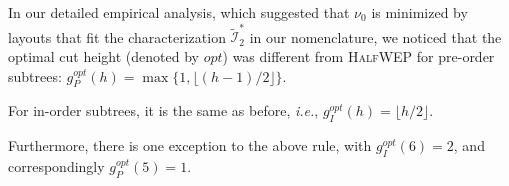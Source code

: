 \documentclass[10pt,conference,letterpaper]{IEEEtran}
\newcommand{\todo}[1]{}
\newcommand{\comment}[1]{}
\newcommand{\HLs}{Hierarchical Layouts\xspace}
\newcommand{\IN}{\ensuremath{\mathcal{I}}\xspace}
\newcommand{\alt}[1]{\widetilde{#1}}
\newcommand{\opt}{\ensuremath{\mathit{opt}}\xspace}
\newcommand{\FLOOR}[1]{\ensuremath{\lfloor #1 \rfloor}\xspace}
\newcommand{\ie}{{\it i.e.}\xspace}
\newcommand{\pwmean}[1][p]{\ensuremath{\nu_{#1}}\xspace}
\newcommand{\minwep}{\textsc{MinWEP}\xspace}
\newcommand{\halfwep}{\textsc{HalfWEP}\xspace}
\begin{document}
\todo{
What about cut heights? Emperical graph comparing with optimal.

ApproxWEP: in/pre have different cut heights. Why do we use these? Motivation - symmetric, and empirical.
Other Observations: For MINWEP, special cases cut heights.

}

\comment{
To find the best cut height, we undertook a detailed empirical study that computed \pwmean[0] for all \HLs restricted to in-order and pre-order arrangements of the top subtree at each branch of the recursion. Two factors were allowed to vary. We allowed every subtree to be aranged in-, pre-, or post-order, and we considered all possible cut heights $g \leq \FLOOR{h/2}$ (we quickly determined that larger $g$ were not beneficial). We calculated \pwmean[0] for each potential layout to find \minwep for each tree height. 
}
In our detailed empirical analysis, which suggested that \pwmean[0] is minimized by layouts that fit the characterization $\alt{\IN}^*_2$ in our nomenclature, we noticed that the optimal cut height (denoted by \opt) was different from \halfwep for pre-order subtrees: $g_P^{\opt}(h) = \max\{1, \FLOOR{(h-1)/2}\}$.
\comment{
\begin{itemize}
\item
For every case, the \minwep layout arranged the bottom subtrees just as in \halfwep --- Those closest to the top subtree were arranged pre-order, and all others in-order.
\item
}
For in-order subtrees, it is the same as before, \ie, $g_I^\opt(h) = \FLOOR{h/2}$.
\comment{The optimal cut height, denoted by \opt, is different from \halfwep for pre-order subtrees}
Furthermore, there is one exception to the above rule, with $g_I^\opt(6) = 2$, and correspondingly
$g_P^\opt(5) = 1$.
\end{document}

